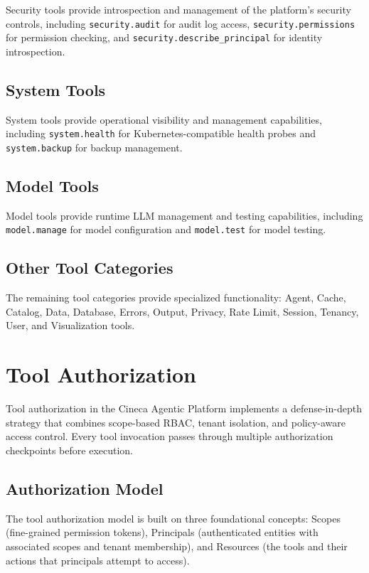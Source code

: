 \documentclass[a4paper,twoside]{sapthesis}
\begin{document}
Security tools provide introspection and management of the platform's security controls, including \texttt{security.audit} for audit log access, \texttt{security.permissions} for permission checking, and \texttt{security.describe\_principal} for identity introspection.

\subsection{System Tools}
\label{subsec:system-tools}

System tools provide operational visibility and management capabilities, including \texttt{system.health} for Kubernetes-compatible health probes and \texttt{system.backup} for backup management.

\subsection{Model Tools}
\label{subsec:model-tools}

Model tools provide runtime LLM management and testing capabilities, including \texttt{model.manage} for model configuration and \texttt{model.test} for model testing.

\subsection{Other Tool Categories}
\label{subsec:other-tools}

The remaining tool categories provide specialized functionality: Agent, Cache, Catalog, Data, Database, Errors, Output, Privacy, Rate Limit, Session, Tenancy, User, and Visualization tools.

\section{Tool Authorization}
\label{sec:tool-authorization}

Tool authorization in the Cineca Agentic Platform implements a defense-in-depth strategy that combines scope-based RBAC, tenant isolation, and policy-aware access control. Every tool invocation passes through multiple authorization checkpoints before execution.

\subsection{Authorization Model}
\label{subsec:authorization-model}

The tool authorization model is built on three foundational concepts: Scopes (fine-grained permission tokens), Principals (authenticated entities with associated scopes and tenant membership), and Resources (the tools and their actions that principals attempt to access).
\end{document}

